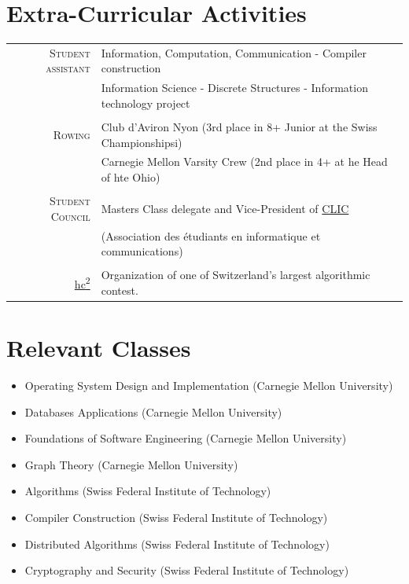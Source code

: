 \documentclass[a4paper,11pt]{article} %
\begin{document}
\section{Extra-Curricular Activities}
\begin{tabular}{rl}
\textsc{\large{Student assistant}} &
Information, Computation, Communication -
Compiler construction\\
& Information Science - Discrete Structures - 
Information technology project \\
\multicolumn{2}{c}{} \\

\textsc{\large{Rowing}} &
Club d'Aviron Nyon (3rd place in 8+ Junior at the Swiss Championshipsi)\\
& Carnegie Mellon Varsity Crew (2nd place in 4+ at he Head of hte Ohio)\\
\multicolumn{2}{c}{} \\

\textsc{\large{Student Council}} &
Masters Class delegate and Vice-President of
\href{http://clic.epfl.ch/}{CLIC}\\
& (Association des étudiants en informatique et communications)\\
\multicolumn{2}{c}{} \\

\large{\href{http://hc2.ch/}{hc\textsuperscript{2}}} & Organization of one of
Switzerland's largest algorithmic contest.\\
\end{tabular}



\section{Relevant Classes}
\begin{center}
\begin{itemize}
\item Operating System Design and Implementation (Carnegie Mellon University) 
\item Databases Applications (Carnegie Mellon University)
\item Foundations of Software Engineering (Carnegie Mellon University)
\item Graph Theory (Carnegie Mellon University)
\item Algorithms (Swiss Federal Institute of Technology)
\item Compiler Construction (Swiss Federal Institute of Technology)
\item Distributed Algorithms (Swiss Federal Institute of Technology)
\item Cryptography and Security (Swiss Federal Institute of Technology)
\end{itemize}
\end{center}
\end{document}
